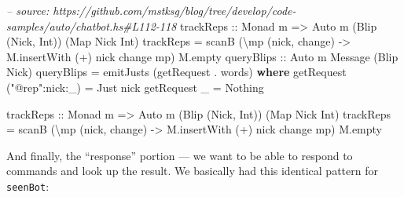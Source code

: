 \documentclass[]{article}
\newenvironment{Shaded}{}{}
\newcommand{\KeywordTok}[1]{\textcolor[rgb]{0.00,0.44,0.13}{\textbf{{#1}}}}
\newcommand{\DataTypeTok}[1]{\textcolor[rgb]{0.56,0.13,0.00}{{#1}}}
\newcommand{\StringTok}[1]{\textcolor[rgb]{0.25,0.44,0.63}{{#1}}}
\newcommand{\CommentTok}[1]{\textcolor[rgb]{0.38,0.63,0.69}{\textit{{#1}}}}
\newcommand{\OtherTok}[1]{\textcolor[rgb]{0.00,0.44,0.13}{{#1}}}
\newcommand{\FunctionTok}[1]{\textcolor[rgb]{0.02,0.16,0.49}{{#1}}}
\newcommand{\NormalTok}[1]{{#1}}
\begin{document}
\begin{Shaded}
\begin{Highlighting}[]
\CommentTok{-- source: https://github.com/mstksg/blog/tree/develop/code-samples/auto/chatbot.hs#L112-118}
\OtherTok{    trackReps ::} \DataTypeTok{Monad} \NormalTok{m }\OtherTok{=>} \DataTypeTok{Auto} \NormalTok{m (}\DataTypeTok{Blip} \NormalTok{(}\DataTypeTok{Nick}\NormalTok{, }\DataTypeTok{Int}\NormalTok{)) (}\DataTypeTok{Map} \DataTypeTok{Nick} \DataTypeTok{Int}\NormalTok{)}
    \NormalTok{trackReps }\FunctionTok{=} \NormalTok{scanB (\textbackslash{}mp (nick, change) }\OtherTok{->} \NormalTok{M.insertWith (}\FunctionTok{+}\NormalTok{) nick change mp) M.empty}
\OtherTok{    queryBlips ::} \DataTypeTok{Auto} \NormalTok{m }\DataTypeTok{Message} \NormalTok{(}\DataTypeTok{Blip} \DataTypeTok{Nick}\NormalTok{)}
    \NormalTok{queryBlips }\FunctionTok{=} \NormalTok{emitJusts (getRequest }\FunctionTok{.} \NormalTok{words)}
      \KeywordTok{where}
        \NormalTok{getRequest (}\StringTok{"@rep"}\FunctionTok{:}\NormalTok{nick}\FunctionTok{:}\NormalTok{_) }\FunctionTok{=} \DataTypeTok{Just} \NormalTok{nick}
        \NormalTok{getRequest _                }\FunctionTok{=} \DataTypeTok{Nothing}



\OtherTok{trackReps ::} \DataTypeTok{Monad} \NormalTok{m }\OtherTok{=>} \DataTypeTok{Auto} \NormalTok{m (}\DataTypeTok{Blip} \NormalTok{(}\DataTypeTok{Nick}\NormalTok{, }\DataTypeTok{Int}\NormalTok{)) (}\DataTypeTok{Map} \DataTypeTok{Nick} \DataTypeTok{Int}\NormalTok{)}
\NormalTok{trackReps }\FunctionTok{=} \NormalTok{scanB (\textbackslash{}mp (nick, change) }\OtherTok{->} \NormalTok{M.insertWith (}\FunctionTok{+}\NormalTok{) nick change mp) M.empty}
\end{Highlighting}
\end{Shaded}

And finally, the ``response'' portion --- we want to be able to respond to
commands and look up the result. We basically had this identical pattern for
\texttt{seenBot}:
\end{document}
